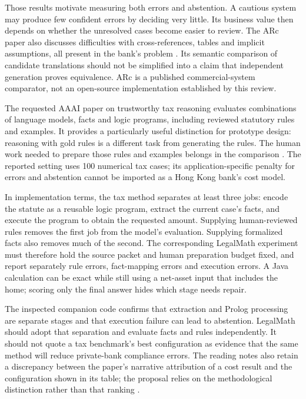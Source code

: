Those results motivate measuring both errors and abstention. A cautious system
may produce few confident errors by deciding very little. Its business value
then depends on whether the unresolved cases become easier to review. The ARc
paper also discusses difficulties with cross-references, tables and implicit
assumptions, all present in the bank's problem
\citep[sec.~5 and app.~A.1]{arc2025}. Its semantic comparison of candidate
translations should not be simplified into a claim that independent generation
proves equivalence. ARc is a published commercial-system comparator, not an
open-source implementation established by this review.

The requested AAAI paper on trustworthy tax reasoning evaluates combinations of
language models, facts and logic programs, including reviewed statutory rules and
examples. It provides a particularly useful distinction for prototype design:
reasoning with gold rules is a different task from generating the rules. The
human work needed to prepare those rules and examples belongs in the comparison
\citep[Tables~2--3]{jurayj2026,jurayj2025extended}. The reported setting uses
100 numerical tax cases; its application-specific penalty for errors and abstention
cannot be imported as a Hong Kong bank's cost model.

In implementation terms, the tax method separates at least three jobs: encode
the statute as a reusable logic program, extract the current case's facts, and
execute the program to obtain the requested amount. Supplying human-reviewed
rules removes the first job from the model's evaluation. Supplying formalized
facts also removes much of the second. The corresponding LegalMath experiment
must therefore hold the source packet and human preparation budget fixed, and
report separately rule errors, fact-mapping errors and execution errors. A Java
calculation can be exact while still using a net-asset input that includes the
home; scoring only the final answer hides which stage needs repair.

The inspected companion code confirms that extraction and Prolog processing are
separate stages and that execution failure can lead to abstention. LegalMath
should adopt that separation and evaluate facts and rules independently. It
should not quote a tax benchmark's best configuration as evidence that the same
method will reduce private-bank compliance errors. The reading notes also retain
a discrepancy between the paper's narrative attribution of a cost result and
the configuration shown in its table; the proposal relies on the methodological
distinction rather than that ranking \citep{libraryreview}.

